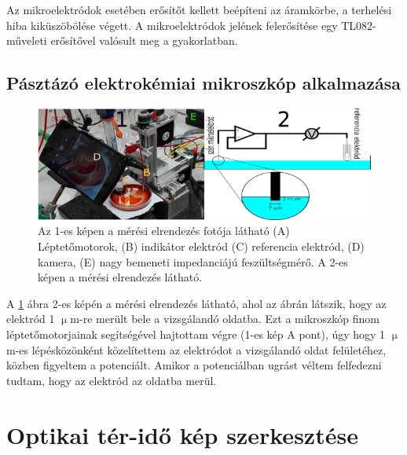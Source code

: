 Az mikroelektródok esetében erősítőt kellett beépíteni az áramkörbe, a terhelési hiba kiküszöbölése végett. 
A mikroelektródok jelének felerősítése egy TL082-műveleti erősítővel valósult meg a gyakorlatban.


\subsection{Pásztázó elektrokémiai mikroszkóp alkalmazása}

\begin{figure}
\centering
\includegraphics[width=1\textwidth]{img/secm.png}
\caption{Az 1-es képen a mérési elrendezés fotója látható (A) Léptetőmotorok, (B) indikátor elektród (C) referencia elektród, (D) kamera, (E) nagy bemeneti impedanciájú feszültségmérő. A 2-es képen a mérési elrendezés látható.}
\label{fig:secm}
\end{figure}

A \ref{fig:secm} ábra 2-es képén a mérési elrendezés látható, ahol az ábrán látszik, hogy az elektród 1 $\upmu$m-re merült bele a vizsgálandó oldatba. Ezt a mikroszkóp finom léptetőmotorjainak segítségével hajtottam végre (1-es kép A pont), úgy hogy 1 $\upmu$m-es lépésközönként közelítettem az elektródot a vizsgálandó oldat felületéhez, közben figyeltem a potenciált. Amikor a potenciálban ugrást véltem felfedezni tudtam, hogy az elektród az oldatba merül.


\section{Optikai tér-idő kép szerkesztése}
